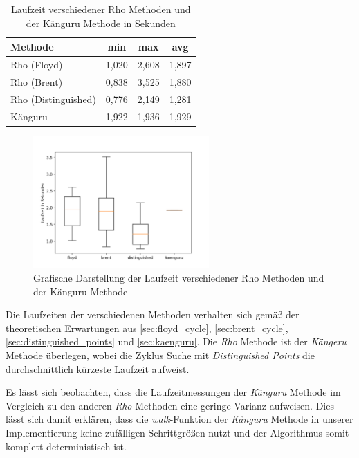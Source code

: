 \documentclass{scrartcl}
\begin{document}
\begin{table}[h]
  \centering
  \begin{tabular}{l|c|c|c}
    Methode             & min   & max   & avg   \\ \hline
    Rho (Floyd)         & 1,020 & 2,608 & 1,897  \\ \hline
    Rho (Brent)         & 0,838 & 3,525 & 1,880 \\ \hline
    Rho (Distinguished) & 0,776 & 2,149 & 1,281 \\ \hline
    Känguru             & 1,922 & 1,936 & 1,929
    \end{tabular}
  \caption{Laufzeit verschiedener Rho Methoden und der Känguru Methode in Sekunden}
  \label{tab:benchmark}
\end{table}

\begin{figure}[h]
  \centering
  \includegraphics[width=0.6\textwidth]{../projekt/benchmark/plot.png}
  \caption{Grafische Darstellung der Laufzeit verschiedener Rho Methoden und der Känguru Methode}
  \label{fig:benchmark}
\end{figure}

Die Laufzeiten der verschiedenen Methoden verhalten sich gemäß der
theoretischen Erwartungen aus \ref{sec:floyd_cycle},
\ref{sec:brent_cycle}, \ref{sec:distinguished_points} und
\ref{sec:kaenguru}.
Die \emph{Rho} Methode ist der \emph{Kängeru} Methode überlegen,
wobei die Zyklus Suche mit \emph{Distinguished Points} die durchschnittlich
kürzeste Laufzeit aufweist.

Es lässt sich beobachten, dass die Laufzeitmessungen der \emph{Känguru}
Methode im Vergleich zu den anderen \emph{Rho} Methoden eine geringe Varianz
aufweisen.
Dies lässt sich damit erklären, dass die \emph{walk}-Funktion der
\emph{Känguru} Methode in unserer Implementierung keine zufälligen
Schrittgrößen nutzt und der Algorithmus somit komplett deterministisch
ist.
\end{document}
